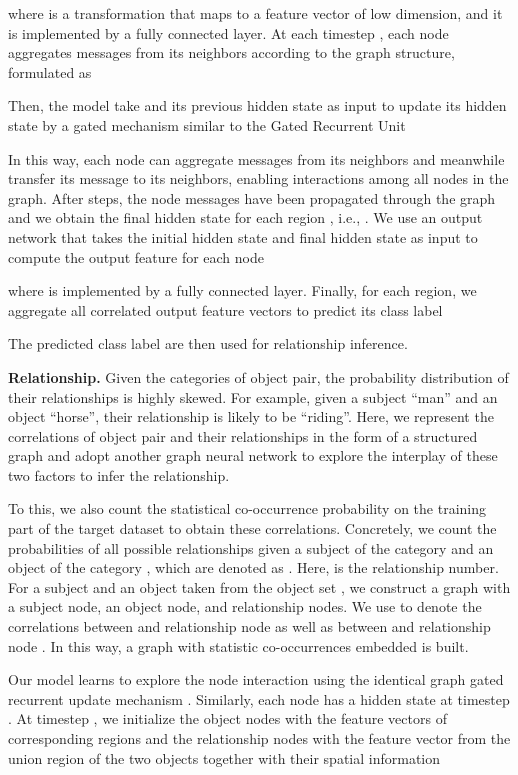 \documentclass[10pt,twocolumn,letterpaper]{article}
\begin{document}
where  is a transformation that maps  to a feature vector of low dimension, and it is implemented by a fully connected layer. At each timestep , each node aggregates messages from its neighbors according to the graph structure, formulated as

Then, the model take  and its previous hidden state as input to update its hidden state by a gated mechanism similar to the Gated Recurrent Unit \cite{cho2014learning,li2016gated}

In this way, each node can aggregate messages from its neighbors and meanwhile transfer its message to its neighbors, enabling interactions among all nodes in the graph. After  steps, the node messages have been propagated through the graph and we obtain the final hidden state for each region , i.e., . We use an output network that takes the initial hidden state and final hidden state as input to compute the output feature for each node

where  is implemented by a fully connected layer. Finally, for each region, we aggregate all correlated output feature vectors to predict its class label

The predicted class label  are then used for relationship inference.

\noindent\textbf{Relationship. }Given the categories of object pair, the probability distribution of their relationships is highly skewed. For example, given a subject ``man'' and an object ``horse'', their relationship is likely to be ``riding''. Here, we represent the correlations of object pair and their relationships in the form of a structured graph and adopt another graph neural network to explore the interplay of these two factors to infer the relationship. 

To this, we also count the statistical co-occurrence probability on the training part of the target dataset to obtain these correlations. Concretely, we count the probabilities of all possible relationships given a subject of the category  and an object of the category , which are denoted as . Here,  is the relationship number. For a subject  and an object  taken from the object set , we construct a graph with a subject node, an object node, and  relationship nodes. We use  to denote the correlations between  and relationship node  as well as between  and relationship node . In this way, a graph with statistic co-occurrences embedded is built.

Our model learns to explore the node interaction using the identical graph gated recurrent update mechanism \cite{li2016gated}. Similarly, each node  has a hidden state  at timestep . At timestep , we initialize the object nodes with the feature vectors of corresponding regions and the relationship nodes with the feature vector from the union region of the two objects together with their spatial information
\end{document}
